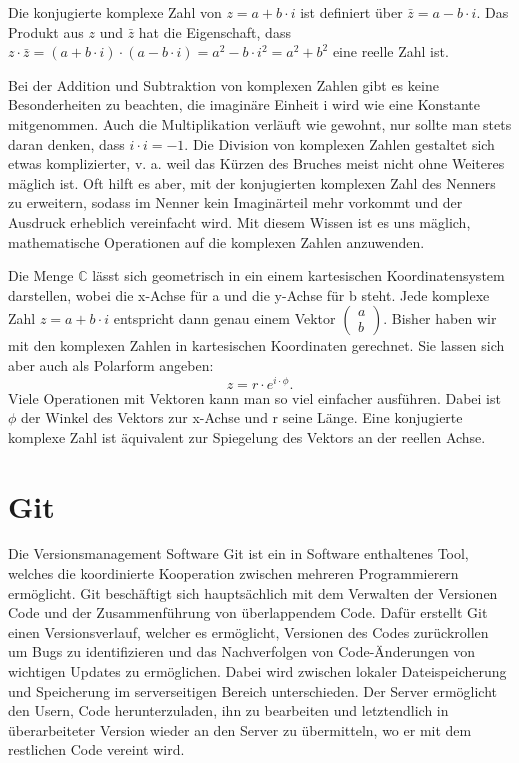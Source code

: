 \documentclass[]{dsadokumentation}
\begin{document}
Die konjugierte komplexe Zahl von $z=a+b\cdot i$ ist definiert über $\bar{z}=a-b\cdot i$. Das Produkt aus $z$ und $\bar{z}$ hat die Eigenschaft, dass $z\cdot \bar{z}=(a+b\cdot i)\cdot (a-b\cdot i)=a^2-b\cdot i^2=a^2+b^2$ eine reelle Zahl ist.

Bei der Addition und Subtraktion von komplexen Zahlen gibt es keine Besonderheiten zu beachten, die imaginäre Einheit i wird wie eine Konstante mitgenommen. Auch die Multiplikation verläuft wie gewohnt, nur sollte man stets daran denken, dass $i\cdot i=-1$.
Die Division von komplexen Zahlen gestaltet sich etwas komplizierter, v. a. weil das Kürzen des Bruches meist nicht ohne Weiteres mäglich ist. Oft hilft es aber, mit der konjugierten komplexen Zahl des Nenners zu erweitern, sodass im Nenner kein Imaginärteil mehr vorkommt und der Ausdruck erheblich vereinfacht wird. Mit diesem Wissen ist es uns mäglich, mathematische Operationen auf die komplexen Zahlen anzuwenden.

Die Menge $\mathbb{C}$ lässt sich geometrisch in ein einem kartesischen Koordinatensystem darstellen, wobei die x-Achse für a und die y-Achse für b steht. Jede komplexe Zahl $z=a+b\cdot i$ entspricht dann genau einem Vektor $\begin{pmatrix} a\\b
\end{pmatrix}$.
Bisher haben wir mit den komplexen Zahlen in kartesischen Koordinaten gerechnet. Sie lassen sich aber auch als Polarform angeben:
\begin{equation}
z=r\cdot e^{i\cdot\phi}.
\end{equation}
Viele Operationen mit Vektoren kann man so viel einfacher ausführen. Dabei ist $\phi$ der Winkel des Vektors zur x-Achse und r seine Länge. Eine konjugierte komplexe Zahl ist äquivalent zur Spiegelung des Vektors an der reellen Achse.

\section{Git}
Die Versionsmanagement Software Git ist ein in Software enthaltenes Tool, welches die koordinierte Kooperation zwischen mehreren Programmierern ermöglicht. Git beschäftigt sich hauptsächlich mit dem Verwalten der Versionen Code und der Zusammenführung von überlappendem Code. Dafür erstellt Git einen Versionsverlauf, welcher es ermöglicht, Versionen des Codes zurückrollen um Bugs zu identifizieren und das Nachverfolgen von Code-Änderungen von wichtigen Updates zu ermöglichen. Dabei wird zwischen lokaler Dateispeicherung und Speicherung im serverseitigen Bereich unterschieden. Der Server ermöglicht den Usern, Code herunterzuladen, ihn zu bearbeiten und letztendlich in überarbeiteter Version wieder an den Server zu übermitteln, wo er mit dem restlichen Code vereint wird.
\end{document}

